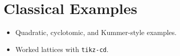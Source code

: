\section{Classical Examples}
\begin{itemize}
  \item Quadratic, cyclotomic, and Kummer-style examples.
  \item Worked lattices with \texttt{tikz-cd}.
\end{itemize}
